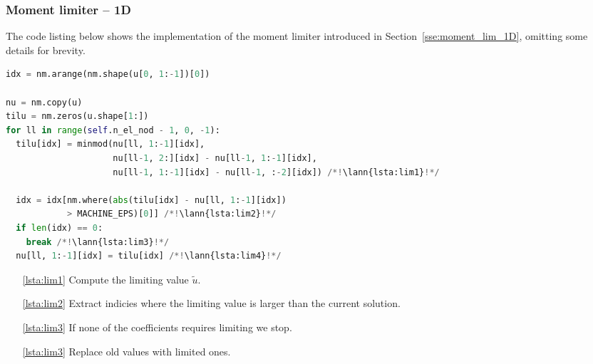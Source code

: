 \subsubsection{Moment limiter -- 1D}
\label{se:i_moment_lim_1D}
The code listing below shows the implementation of the moment limiter introduced in Section~\ref{sse:moment_lim_1D},
omitting some details for brevity.
\setcounter{lstannotation}{0}
\begin{lstlisting}[language=Python, caption=Moment limiter for 1D]
idx = nm.arange(nm.shape(u[0, 1:-1])[0])

nu = nm.copy(u)
tilu = nm.zeros(u.shape[1:])
for ll in range(self.n_el_nod - 1, 0, -1):
  tilu[idx] = minmod(nu[ll, 1:-1][idx],
                     nu[ll-1, 2:][idx] - nu[ll-1, 1:-1][idx],
                     nu[ll-1, 1:-1][idx] - nu[ll-1, :-2][idx]) /*!\lann{lsta:lim1}!*/

  idx = idx[nm.where(abs(tilu[idx] - nu[ll, 1:-1][idx])
            > MACHINE_EPS)[0]] /*!\lann{lsta:lim2}!*/
  if len(idx) == 0:
    break /*!\lann{lsta:lim3}!*/
  nu[ll, 1:-1][idx] = tilu[idx] /*!\lann{lsta:lim4}!*/
\end{lstlisting}
\begin{itemize}
    \item [\ref{lsta:lim1}] Compute the limiting value $\tilde{u}$.
    \item [\ref{lsta:lim2}] Extract indicies where the limiting value is
    larger than the
    current solution.
    \item[\ref{lsta:lim3}] If none of the coefficients requires limiting we
    stop.
    \item [\ref{lsta:lim3}] Replace old values with limited ones.

\end{itemize}

